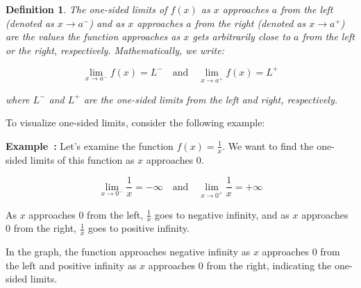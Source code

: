 \documentclass[a4paper,12pt]{book}
\newcounter{example}
\newenvironment{example}[1][\theexample]
  {\refstepcounter{example}\par\medskip\noindent\textbf{Example~#1:} \rmfamily}
  {\medskip}
\newtheorem{definition}{Definition}
\begin{document}
\begin{definition}
The one-sided limits of \( f(x) \) as \( x \) approaches \( a \) from the left (denoted as \( x \to a^- \)) and as \( x \) approaches \( a \) from the right (denoted as \( x \to a^+ \)) are the values the function approaches as \( x \) gets arbitrarily close to \( a \) from the left or the right, respectively. Mathematically, we write:

\[
\lim_{{x \to a^-}} f(x) = L^- \quad \text{and} \quad \lim_{{x \to a^+}} f(x) = L^+
\]

where \( L^- \) and \( L^+ \) are the one-sided limits from the left and right, respectively.

\end{definition}

To visualize one-sided limits, consider the following example:

\begin{example}
Let's examine the function \( f(x) = \frac{1}{x} \). We want to find the one-sided limits of this function as \( x \) approaches \( 0 \).

\[
\lim_{{x \to 0^-}} \frac{1}{x} = -\infty \quad \text{and} \quad \lim_{{x \to 0^+}} \frac{1}{x} = +\infty
\]

As \( x \) approaches \( 0 \) from the left, \( \frac{1}{x} \) goes to negative infinity, and as \( x \) approaches \( 0 \) from the right, \( \frac{1}{x} \) goes to positive infinity.

\begin{center}
\end{center}

In the graph, the function approaches negative infinity as \( x \) approaches \( 0 \) from the left and positive infinity as \( x \) approaches \( 0 \) from the right, indicating the one-sided limits.
\end{example}
\end{document}
